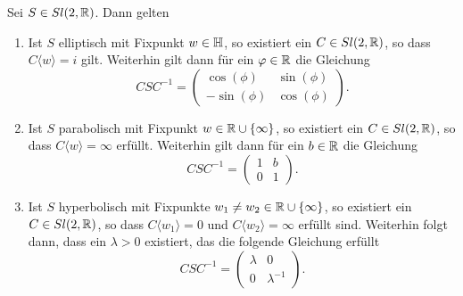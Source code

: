 \begin{lemma}
  \label{lemma:psl-trafo}
  Sei $S \in Sl(2, \mathbb{R})$. Dann gelten
  \begin{enumerate}
  \item Ist $S$ elliptisch mit Fixpunkt $w \in \mathbb{H}$, so existiert ein $C \in Sl(2, \mathbb{R})$, so
    dass $C\langle w \rangle = i$ gilt. Weiterhin gilt dann für ein
    $\varphi \in \mathbb{R}$ die Gleichung
    \[
    C S C^{-1} =
    \begin{pmatrix}
      \cos(\phi) & \sin(\phi) \\
      -\sin(\phi) & \cos(\phi)
    \end{pmatrix}.
    \]
  \item Ist $S$ parabolisch mit Fixpunkt $w \in \mathbb{R} \cup \{\infty\}$,
    so existiert ein $C \in Sl(2, \mathbb{R})$, so dass $C\langle w\rangle =
    \infty$ erfüllt. Weiterhin gilt dann für ein $b \in \mathbb{R}$ die Gleichung
    \[
    C S C^{-1} =
    \begin{pmatrix}
      1 & b\\
      0 & 1
    \end{pmatrix}.
    \]
  \item Ist $S$ hyperbolisch mit Fixpunkte $w_1 \neq w_2 \in \mathbb{R} \cup
    \{\infty\}$, so existiert ein $C \in Sl(2, \mathbb{R})$, so dass $C\langle
    w_1 \rangle = 0$ und $C\langle w_2 \rangle = \infty$ erfüllt
    sind. Weiterhin folgt dann, dass ein $\lambda > 0$ existiert, das
    die folgende Gleichung erfüllt
    \[
    C S C^{-1} = 
    \begin{pmatrix}
      \lambda & 0\\
      0 & \lambda^{-1}
    \end{pmatrix}.
    \]
  \end{enumerate}
\end{lemma}

